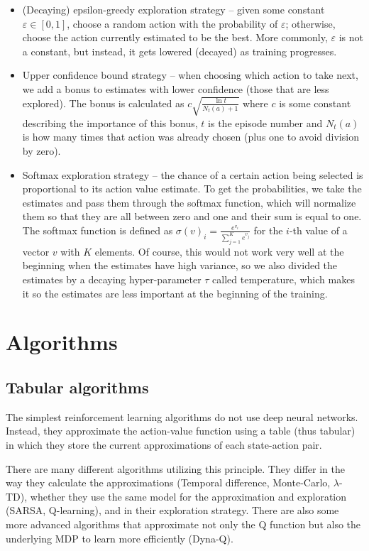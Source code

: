 \documentclass[
  digital,     %
  oneside,     %
  nosansbold,  %
  nocolorbold, %
  lof,         %
  lot,         %
]{fithesis4}
\begin{document}
\begin{itemize}
    \item (Decaying) epsilon-greedy exploration strategy -- given some constant $\varepsilon \in [0,1]$, choose a random action with the probability of $\varepsilon$; otherwise, choose the action currently estimated to be the best. More commonly, $\varepsilon$ is not a constant, but instead, it gets lowered (decayed) as training progresses.
    \item Upper confidence bound strategy -- when choosing which action to take next, we add a bonus to estimates with lower confidence (those that are less explored). The bonus is calculated as $c\sqrt{\frac{\ln{t}}{N_t(a)+1}}$ where $c$ is some constant describing the importance of this bonus, $t$ is the episode number and $N_t(a)$ is how many times that action was already chosen (plus one to avoid division by zero).
    \item Softmax exploration strategy -- the chance of a certain action being selected is proportional to its action value estimate. To get the probabilities, we take the estimates and pass them through the softmax function, which will normalize them so that they are all between zero and one and their sum is equal to one. The softmax function is defined as $\sigma (v)_i = \frac{e^{v_i}}{\sum^{K}_{j=1}e^{v_j}}$ for the $i$-th value of a vector $v$ with $K$ elements. Of course, this would not work very well at the beginning when the estimates have high variance, so we also divided the estimates by a decaying hyper-parameter $\tau$ called temperature, which makes it so the estimates are less important at the beginning of the training.
\end{itemize}


\section{Algorithms}

\subsection{Tabular algorithms}
The simplest reinforcement learning algorithms do not use deep neural networks. Instead, they approximate the action-value function using a table (thus tabular) in which they store the current approximations of each state-action pair.

There are many different algorithms utilizing this principle. They differ in the way they calculate the approximations (Temporal difference, Monte-Carlo, $\lambda$-TD), whether they use the same model for the approximation and exploration (SARSA, Q-learning), and in their exploration strategy. There are also some more advanced algorithms that approximate not only the Q function but also the underlying MDP to learn more efficiently (Dyna-Q).
\end{document}
